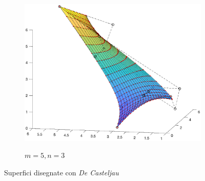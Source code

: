 \documentclass[a4paper, 12pt]{article}
\begin{document}
\begin{figure}[]
\begin{subfigure}[b]{0.6\textwidth}
      \includegraphics[width=\textwidth]{figure/surface_casteljau_m5n3.eps}
      \label{fig:surface_casteljau_m5n3}
      \caption{$m = 5, n = 3$}
  \end{subfigure}
  \caption{Superfici disegnate con \textit{De Casteljau}}\label{fig:surface_casteljau}
\end{figure}
\end{document}
